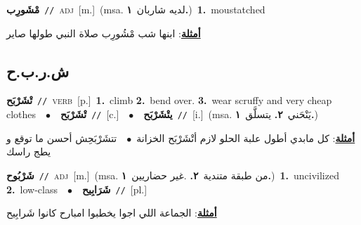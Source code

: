 \documentclass[10pt,a4paper,twoside]{article} %
\begin{document}
\begin{multicols}{2}
{\setlength\topsep{0pt}\textbf{\foreignlanguage{arabic}{مْشَورِب}}\ {\color{gray}\texttt{//}\color{black}}\ \textsc{adj}\ [m.]\ \color{gray}(msa. \foreignlanguage{arabic}{لديه شاربان}~\foreignlanguage{arabic}{\textbf{١.}})\color{black}\ \textbf{1.}~moustatched\  \begin{flushright}\color{gray}\foreignlanguage{arabic}{\textbf{\underline{\foreignlanguage{arabic}{أمثلة}}}: ابنها شب مْشُورِب صلاة النبي طولها صاير}\end{flushright}\color{black}} \vspace{2mm}

\vspace{-3mm}
\subsection*{\color{blue}\foreignlanguage{arabic}{ش.ر.ب.ح}\color{blue}{}} 

{\setlength\topsep{0pt}\textbf{\foreignlanguage{arabic}{تْشَرْبَح}}\ {\color{gray}\texttt{//}\color{black}}\ \textsc{verb}\ [p.]\ \textbf{1.}~climb  \textbf{2.}~bend over.  \textbf{3.}~wear scruffy and very cheap clothes\ \ $\bullet$\ \ \setlength\topsep{0pt}\textbf{\foreignlanguage{arabic}{تْشَرْبَح}}\ {\color{gray}\texttt{//}\color{black}}\ [c.]\ \ $\bullet$\ \ \setlength\topsep{0pt}\textbf{\foreignlanguage{arabic}{يتْشَرْبَح}}\ {\color{gray}\texttt{//}\color{black}}\ [i.]\ \color{gray}(msa. \foreignlanguage{arabic}{يَنْحَني}~\foreignlanguage{arabic}{\textbf{٢.}}  \foreignlanguage{arabic}{يتسلَّق}~\foreignlanguage{arabic}{\textbf{١.}})\color{black}\  \begin{flushright}\color{gray}\foreignlanguage{arabic}{\textbf{\underline{\foreignlanguage{arabic}{أمثلة}}}: كل مابدي أطول علبة الحلو لازم أتْشَرْبَح الخزانة\ $\bullet$\ \  تتشَرْبَحِش أحسن ما توقع و يطج راسك}\end{flushright}\color{black}} \vspace{2mm}

{\setlength\topsep{0pt}\textbf{\foreignlanguage{arabic}{شَرْبُوح}}\ {\color{gray}\texttt{//}\color{black}}\ \textsc{adj}\ [m.]\ \color{gray}(msa. \foreignlanguage{arabic}{من طبقة متندية}~\foreignlanguage{arabic}{\textbf{٢.}}  .\foreignlanguage{arabic}{غير حضاريين}~\foreignlanguage{arabic}{\textbf{١.}})\color{black}\ \textbf{1.}~uncivilized  \textbf{2.}~low-class\ \ $\bullet$\ \ \setlength\topsep{0pt}\textbf{\foreignlanguage{arabic}{شَرَابِيح}}\ {\color{gray}\texttt{//}\color{black}}\ [pl.]\  \begin{flushright}\color{gray}\foreignlanguage{arabic}{\textbf{\underline{\foreignlanguage{arabic}{أمثلة}}}: الجماعة اللي اجوا يخطبوا امبارح كانوا شَرابِيح}\end{flushright}\color{black}} \vspace{2mm}


\end{multicols}
\end{document}
